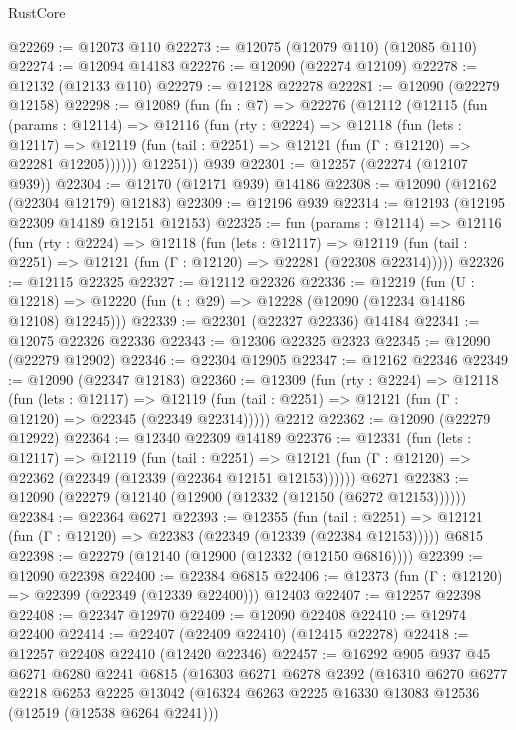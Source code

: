 \begin{lexlean}{RustCore}
\begin{coremodule}
@22269 := @12073 @110
@22273 := @12075 (@12079 @110) (@12085 @110)
@22274 := @12094 @14183
@22276 := @12090 (@22274 @12109)
@22278 := @12132 (@12133 @110)
@22279 := @12128 @22278
@22281 := @12090 (@22279 @12158)
@22298 := @12089
    (fun (fn : @7) =>
    @22276
      (@12112
        (@12115
          (fun (params : @12114) =>
          @12116
            (fun (rty : @2224) =>
            @12118
              (fun (lets : @12117) =>
              @12119 (fun (tail : @2251) => @12121 (fun (Γ : @12120) => @22281 @12205))))))
        @12251))
    @939
@22301 := @12257 (@22274 (@12107 @939))
@22304 := @12170 (@12171 @939) @14186
@22308 := @12090 (@12162 (@22304 @12179) @12183)
@22309 := @12196 @939
@22314 := @12193 (@12195 @22309 @14189 @12151 @12153)
@22325 := fun (params : @12114) =>
  @12116
    (fun (rty : @2224) =>
    @12118
      (fun (lets : @12117) =>
      @12119 (fun (tail : @2251) => @12121 (fun (Γ : @12120) => @22281 (@22308 @22314)))))
@22326 := @12115 @22325
@22327 := @12112 @22326
@22336 := @12219
    (fun (U : @12218) => @12220 (fun (t : @29) => @12228 (@12090 (@12234 @14186 @12108) @12245)))
@22339 := @22301 (@22327 @22336) @14184
@22341 := @12075 @22326 @22336
@22343 := @12306 @22325 @2323
@22345 := @12090 (@22279 @12902)
@22346 := @22304 @12905
@22347 := @12162 @22346
@22349 := @12090 (@22347 @12183)
@22360 := @12309
    (fun (rty : @2224) =>
    @12118
      (fun (lets : @12117) =>
      @12119 (fun (tail : @2251) => @12121 (fun (Γ : @12120) => @22345 (@22349 @22314)))))
    @2212
@22362 := @12090 (@22279 @12922)
@22364 := @12340 @22309 @14189
@22376 := @12331
    (fun (lets : @12117) =>
    @12119
      (fun (tail : @2251) =>
      @12121 (fun (Γ : @12120) => @22362 (@22349 (@12339 (@22364 @12151 @12153))))))
    @6271
@22383 := @12090 (@22279 (@12140 (@12900 (@12332 (@12150 (@6272 @12153))))))
@22384 := @22364 @6271
@22393 := @12355
    (fun (tail : @2251) => @12121 (fun (Γ : @12120) => @22383 (@22349 (@12339 (@22384 @12153)))))
    @6815
@22398 := @22279 (@12140 (@12900 (@12332 (@12150 @6816))))
@22399 := @12090 @22398
@22400 := @22384 @6815
@22406 := @12373 (fun (Γ : @12120) => @22399 (@22349 (@12339 @22400))) @12403
@22407 := @12257 @22398
@22408 := @22347 @12970
@22409 := @12090 @22408
@22410 := @12974 @22400
@22414 := @22407 (@22409 @22410) (@12415 @22278)
@22418 := @12257 @22408 @22410 (@12420 @22346)
@22457 := @16292
    @905
    @937
    @45
    @6271
    @6280
    @2241
    @6815
    (@16303
      @6271
      @6278
      @2392
      (@16310
        @6270
        @6277
        @2218
        @6253
        @2225
        @13042
        (@16324 @6263 @2225 @16330 @13083 @12536 (@12519 (@12538 @6264 @2241)))

\end{coremodule}
\end{lexlean}
